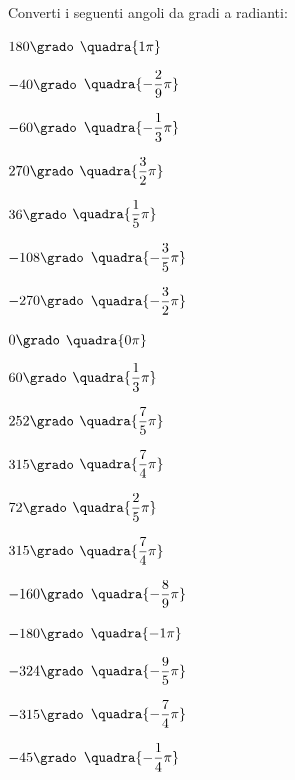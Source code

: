 \begin{esercizio}\label{ese:gonio.1}
 Converti i seguenti angoli da gradi a radianti:
\begin{multicols}{3}
 \begin{enumeratea}
  \item  $180\grado$
   \hfill $\quadra{1\pi}$
  \item  $-40\grado$
   \hfill $\quadra{-\dfrac{2}{9}\pi}$
  \item  $-60\grado$
   \hfill $\quadra{-\dfrac{1}{3}\pi}$
  \item  $270\grado$
   \hfill $\quadra{\dfrac{3}{2}\pi}$
  \item  $36\grado$
   \hfill $\quadra{\dfrac{1}{5}\pi}$
  \item  $-108\grado$
   \hfill $\quadra{-\dfrac{3}{5}\pi}$
  \item  $-270\grado$
   \hfill $\quadra{-\dfrac{3}{2}\pi}$
  \item  $0\grado$
   \hfill $\quadra{0\pi}$
  \item  $60\grado$
   \hfill $\quadra{\dfrac{1}{3}\pi}$
  \item  $252\grado$
   \hfill $\quadra{\dfrac{7}{5}\pi}$
  \item  $315\grado$
   \hfill $\quadra{\dfrac{7}{4}\pi}$
  \item  $72\grado$
   \hfill $\quadra{\dfrac{2}{5}\pi}$
  \item  $315\grado$
   \hfill $\quadra{\dfrac{7}{4}\pi}$
  \item  $-160\grado$
   \hfill $\quadra{-\dfrac{8}{9}\pi}$
  \item  $-180\grado$
   \hfill $\quadra{-1\pi}$
  \item  $-324\grado$
   \hfill $\quadra{-\dfrac{9}{5}\pi}$
  \item  $-315\grado$
   \hfill $\quadra{-\dfrac{7}{4}\pi}$
  \item  $-45\grado$
   \hfill $\quadra{-\dfrac{1}{4}\pi}$
 \end{enumeratea}
\end{multicols}
\end{esercizio}

